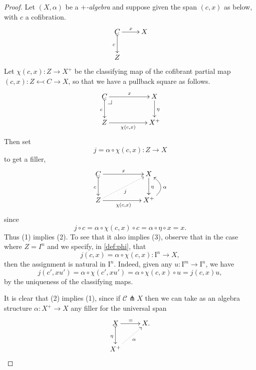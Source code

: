 \documentclass[11pt,reqno]{amsart}
\makeatletter
\newcommand{\ra}{\ensuremath{\rightarrow}}
\renewcommand{\to}{\ensuremath{\rightarrow}}
\newcommand{\I}{\ensuremath{\mathrm{I}}}
\theoremstyle{remark}
\theoremstyle{definition}
\newcommand{\pbcorner}[1][dr]{\save*!/#1-1.2pc/#1:(-1,1)@^{|-}\restore}
\makeatother
\begin{document}
\begin{proof}
Let $(X, \alpha)$ be a \emph{$+$-algebra} and suppose given the span $(c,x)$ as below, with $c$ a cofibration. 
\begin{equation*}%
\xymatrix{
C \ar@{>->}[d]_{c} \ar[r]^{x} & X \\
Z &
}
\end{equation*}
Let $\chi(c,x): Z\ra X^+$ be the classifying map of the cofibrant partial map $(c,x) : Z \leftarrowtail C \to X$, so that we have a pullback square as follows.
\begin{equation}\label{diagram:defphi}
\xymatrix{
C \ar@{>->}[d]_{c} \ar[rr]^{x} \pbcorner && X \ar[d]^{\eta} \\
Z \ar[rr]_-{\chi(c,x)} && X^+
}
\end{equation}
Then set
\begin{equation}\label{def:phi}
j = \alpha\circ\chi(c,x) : Z\ra X
\end{equation}
to get a filler,
\begin{equation}\label{diagram:defphi2}
\xymatrix{
C \ar@{>->}[d]_{c} \ar[rr]^{x} && X \ar[d]^{\eta} \\
Z\ar@{.>}[rru]_{j} \ar[rr]_{\chi(c,x)} && X^+  \ar@/_4ex/ [u]_\alpha
}
\end{equation}
since 
\[
j\circ c = \alpha\circ\chi(c,x)\circ c = \alpha\circ\eta \circ x = x.
\]
Thus (1) implies (2).  To see that it also implies (3), observe that in the case where $Z=I^n$ and we specify, in \eqref{def:phi}, that
\begin{equation}\label{def:j}
j(c,x) = \alpha\circ\chi(c,x) : \I^n\ra X,
\end{equation}
then the assignment is natural in $\I^n$. Indeed,  given any $u : \I^m \ra \I^n$, we have
\begin{equation}\label{eq:proof,uniformfillers}
j(c',xu') = \alpha\circ\chi(c',xu') = \alpha\circ\chi(c,x)\circ u = j(c,x) u,
\end{equation}
by the uniqueness of the classifying maps.

It is clear that (2) implies (1), since if $\mathcal{C} \pitchfork X$ then we can take as an algebra structure $\alpha : X^+ \ra X$ any filler for the universal span
\[
\xymatrix{
X \ar@{>->}[d]_{\eta} \ar[r]^{=} & X .\\
X^+ \ar@{.>}[ru]_\alpha&
}
\]


\end{proof}
\end{document}
